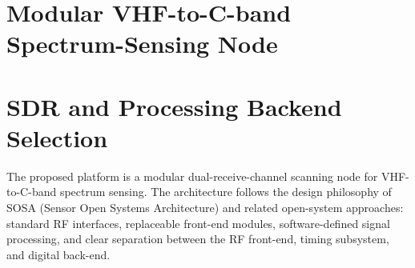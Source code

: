 \documentclass[11pt,a4paper]{article}
\begin{document}
	
	\section*{\centering Modular VHF-to-C-band Spectrum-Sensing Node}
	\noindent
	\section*{SDR and Processing Backend Selection}
	
	The proposed platform is a modular dual-receive-channel scanning node for
	VHF-to-C-band spectrum sensing. The architecture follows the design philosophy
	of SOSA (Sensor Open Systems Architecture) and related open-system approaches:
	standard RF interfaces, replaceable front-end modules, software-defined signal
	processing, and clear separation between the RF front-end, timing subsystem, and
	digital back-end.
	
\end{document}
